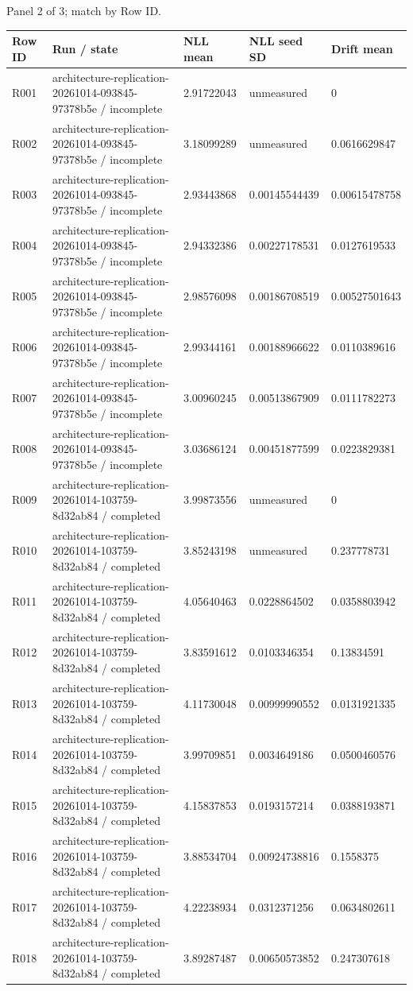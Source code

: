 \documentclass[10pt]{article}
\begin{document}
\par\noindent Panel 2 of 3; match by Row ID.
{\scriptsize\setlength{\tabcolsep}{2pt}
\begin{longtable}{p{}p{}p{}p{}p{}}
Row ID & Run / state & NLL mean & NLL seed SD & Drift mean \\
\hline\endhead
R001 & architecture-replication-20261014-093845-97378b5e / incomplete & 2.91722043 & unmeasured & 0 \\
R002 & architecture-replication-20261014-093845-97378b5e / incomplete & 3.18099289 & unmeasured & 0.0616629847 \\
R003 & architecture-replication-20261014-093845-97378b5e / incomplete & 2.93443868 & 0.00145544439 & 0.00615478758 \\
R004 & architecture-replication-20261014-093845-97378b5e / incomplete & 2.94332386 & 0.00227178531 & 0.0127619533 \\
R005 & architecture-replication-20261014-093845-97378b5e / incomplete & 2.98576098 & 0.00186708519 & 0.00527501643 \\
R006 & architecture-replication-20261014-093845-97378b5e / incomplete & 2.99344161 & 0.00188966622 & 0.0110389616 \\
R007 & architecture-replication-20261014-093845-97378b5e / incomplete & 3.00960245 & 0.00513867909 & 0.0111782273 \\
R008 & architecture-replication-20261014-093845-97378b5e / incomplete & 3.03686124 & 0.00451877599 & 0.0223829381 \\
R009 & architecture-replication-20261014-103759-8d32ab84 / completed & 3.99873556 & unmeasured & 0 \\
R010 & architecture-replication-20261014-103759-8d32ab84 / completed & 3.85243198 & unmeasured & 0.237778731 \\
R011 & architecture-replication-20261014-103759-8d32ab84 / completed & 4.05640463 & 0.0228864502 & 0.0358803942 \\
R012 & architecture-replication-20261014-103759-8d32ab84 / completed & 3.83591612 & 0.0103346354 & 0.13834591 \\
R013 & architecture-replication-20261014-103759-8d32ab84 / completed & 4.11730048 & 0.00999990552 & 0.0131921335 \\
R014 & architecture-replication-20261014-103759-8d32ab84 / completed & 3.99709851 & 0.0034649186 & 0.0500460576 \\
R015 & architecture-replication-20261014-103759-8d32ab84 / completed & 4.15837853 & 0.0193157214 & 0.0388193871 \\
R016 & architecture-replication-20261014-103759-8d32ab84 / completed & 3.88534704 & 0.00924738816 & 0.1558375 \\
R017 & architecture-replication-20261014-103759-8d32ab84 / completed & 4.22238934 & 0.0312371256 & 0.0634802611 \\
R018 & architecture-replication-20261014-103759-8d32ab84 / completed & 3.89287487 & 0.00650573852 & 0.247307618 \\
\end{longtable}}
\end{document}
